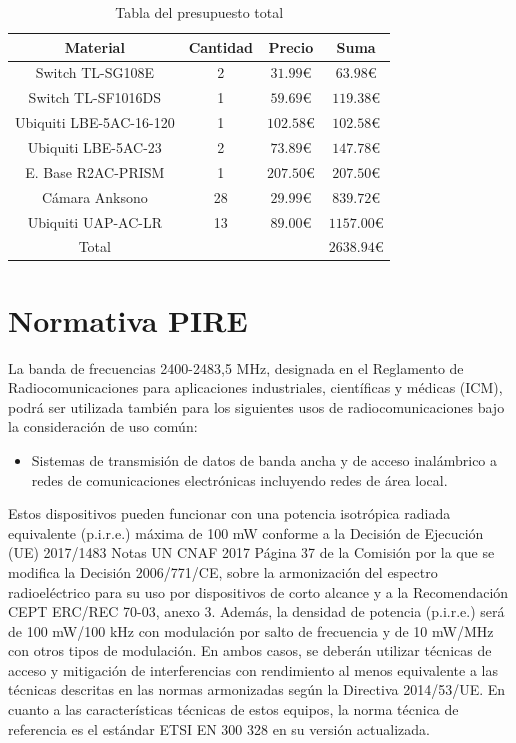 \documentclass{article}
\begin{document}
\begin{table}[ht]
    \centering
    \begin{tabular}{|c|c|c|c|}
        \hline
        Material & Cantidad & Precio & Suma \\
        \hline
        Switch TL-SG108E & 2 & $31.99\euro{}$ & $63.98\euro{}$ \\
        Switch TL-SF1016DS & 1 & $59.69\euro{}$ & $119.38\euro{}$ \\
        Ubiquiti LBE-5AC-16-120  & 1 & $102.58\euro{}$ & $102.58\euro{}$ \\
        Ubiquiti LBE-5AC-23& 2 & $73.89\euro{}$ & $147.78\euro{}$ \\
        E. Base R2AC-PRISM & 1 & $207.50\euro{}$ & $207.50\euro{}$ \\
        Cámara Anksono & 28 & $29.99\euro{}$ & $839.72\euro{}$ \\
        Ubiquiti UAP-AC-LR  & 13 & $89.00\euro{}$ & $1157.00\euro{}$ \\
        \hline
        Total &  &  & $2638.94\euro{}$ \\
        \hline
    \end{tabular}
    \caption{Tabla del presupuesto total}
    \label{tab:presupuestos}
\end{table}


\section{Normativa PIRE}

La banda de frecuencias 2400-2483,5 MHz, designada en el Reglamento de
Radiocomunicaciones para aplicaciones industriales, científicas y médicas (ICM),
podrá ser utilizada también para los siguientes usos de radiocomunicaciones bajo la
consideración de uso común:

\begin{itemize}

    \item Sistemas de transmisión de datos de banda ancha y de acceso inalámbrico
    a redes de comunicaciones electrónicas incluyendo redes de área local.

\end{itemize}

    Estos dispositivos pueden funcionar con una potencia isotrópica radiada equivalente
    (p.i.r.e.) máxima de 100 mW conforme a la Decisión de Ejecución (UE) 2017/1483
    Notas UN CNAF 2017 Página 37
    de la Comisión por la que se modifica la Decisión 2006/771/CE, sobre la
    armonización del espectro radioeléctrico para su uso por dispositivos de corto
    alcance y a la Recomendación CEPT ERC/REC 70-03, anexo 3.
    Además, la densidad de potencia (p.i.r.e.) será de 100 mW/100 kHz con modulación
    por salto de frecuencia y de 10 mW/MHz con otros tipos de modulación. En ambos
    casos, se deberán utilizar técnicas de acceso y mitigación de interferencias con
    rendimiento al menos equivalente a las técnicas descritas en las normas
    armonizadas según la Directiva 2014/53/UE.
    En cuanto a las características técnicas de estos equipos, la norma técnica de
    referencia es el estándar ETSI EN 300 328 en su versión actualizada.
\end{document}
